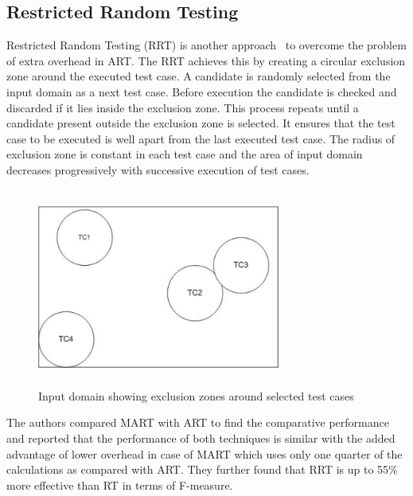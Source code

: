 \subsection{Restricted Random Testing}
Restricted Random Testing (RRT) is another approach~\cite{chan2003normalized} to overcome the problem of extra overhead in ART. The RRT achieves this by creating a circular exclusion zone around the executed test case. A candidate is randomly selected from the input domain as a next test case. Before execution the candidate is checked and discarded if it lies inside the exclusion zone. This process repeats until a candidate present outside the exclusion zone is selected. It ensures that the test case to be executed is well apart from the last executed test case. The radius of exclusion zone is constant in each test case and the area of input domain decreases progressively with successive execution of test cases.
\bigskip
\bigskip
\begin{figure}[h]
	\centering
	\includegraphics[width= 8cm, height = 6.5cm]{chapter2/RRT.pdf}
	\bigskip
	\caption{Input domain showing exclusion zones around selected test cases}
\end{figure}
\bigskip

The authors compared MART with ART to find the comparative performance and reported that the performance of both techniques is similar with the added advantage of lower overhead in case of MART which uses only one quarter of the calculations as compared with ART. %
They further found that RRT is up to 55\% more effective than RT in terms of F-measure.



